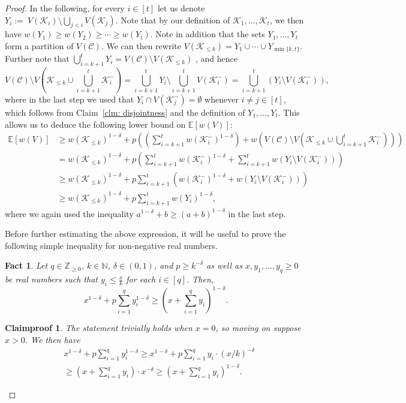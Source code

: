 \documentclass[10pt,a4paper]{amsart}
\newtheorem{claimproof}{Claimproof}
\newtheorem{fact}{Fact}
\begin{document}
\begin{proof}
    In the following, for every $i\in [t]$ let us denote $Y_i:=~V(\mathcal{K}_i)\setminus \bigcup_{j<i}V(\mathcal{K}_j)$. Note that by our definition of $\mathcal{K}_1,\ldots,\mathcal{K}_t$, we then have $w(Y_1)\ge w(Y_2)\ge \cdots\ge w(Y_t)$. Note in addition that the sets $Y_1,\ldots,Y_t$ form a partition of $V(\mathcal{C})$. We can then rewrite $V(\mathcal{K}_{\le k})=Y_1\cup\cdots\cup Y_{\min\{k,t\}}$. Further note that $\bigcup_{i=k+1}^t Y_i=V(\mathcal C)\setminus V(\mathcal{K}_{\le k})$ , and hence  $$V(\mathcal C)\setminus V\left(\mathcal{K}_{\le k}\cup \bigcup_{i=k+1}^t\mathcal{K}_i^-\right)=\bigcup_{i=k+1}^t Y_i\setminus \bigcup_{i=k+1}^{t}V(\mathcal{K}_i^-)=\bigcup_{i=k+1}^{t}(Y_i\setminus V(\mathcal{K}_i^-)),$$ where in the last step we used that $Y_i\cap V(\mathcal{K}_j^-)=\emptyset$ whenever $i\neq j\in [t]$, which follows from Claim~\ref{clm: disjointness} and the definition of $Y_1,\ldots,Y_t$. This allows us to deduce the following lower bound on $\mathbb{E}[w(V)]$:
\begin{align*}\mathbb{E}[w(V)]&\ge w(\mathcal{K}_{\le k})^{1-\delta}+p\left(\left(\sum_{i=k+1}^{t} w(\mathcal{K}_i^-)^{1-\delta}\right)+w\left(V(\mathcal C)\setminus V\left(\mathcal{K}_{\le k}\cup \bigcup_{i=k+1}^t\mathcal{K}_i^-\right)\right)\right)\\
    &=w(\mathcal{K}_{\le k})^{1-\delta}+p\left(\sum_{i=k+1}^{t} w(\mathcal{K}_i^-)^{1-\delta}+\sum_{i=k+1}^t w(Y_i\setminus V(\mathcal{K}_i^-))\right)\\
    &\ge w(\mathcal{K}_{\le k})^{1-\delta}+p\sum_{i=k+1}^t (w(\mathcal{K}_i^-)^{1-\delta}+w(Y_i\setminus V(\mathcal{K}_i^-)))\\
    &\ge w(\mathcal{K}_{\le k})^{1-\delta}+p\sum_{i=k+1}^t w(Y_i)^{1-\delta},
    \end{align*} 
    where we again used the inequality $a^{1-\delta}+b\ge (a+b)^{1-\delta}$ in the last step.

    
    Before further estimating the above expression, it will be useful to prove the following simple inequality for non-negative real numbers.

    \begin{fact}\label{fact: inequality}
    Let $q\in\mathbb{Z}_{\ge 0}$, $k \in \mathbb{N}$, $\delta\in(0,1)$, and $p\ge k^{-\delta}$ as well as $x, y_1,\ldots,y_q\geq 0$ be real numbers such that $y_i\le \frac{x}{k}$ for each $i\in [q]$. Then,
    $$
    x^{1-\delta}+p\sum_{i=1}^q y_i^{1-\delta}\geq \left(x+\sum_{i=1}^qy_i\right)^{1-\delta}.
    $$
\end{fact}
\begin{claimproof}
  The statement trivially holds when $x=0$, so moving on suppose $x>0$. We then have 
    \begin{align*}
        &x^{1-\delta}+p\sum_{i=1}^q y_i^{1-\delta}\geq x^{1-\delta}+p\sum_{i=1}^q y_i\cdot (x/k)^{-\delta}\\ &\ge \left(x+\sum_{i=1}^{q}y_i\right)\cdot x^{-\delta}\ge \left(x+\sum_{i=1}^qy_i\right)^{1-\delta}.
    \end{align*}    
    \vspace{-0.8cm}


\end{claimproof}
\end{proof}
\end{document}
